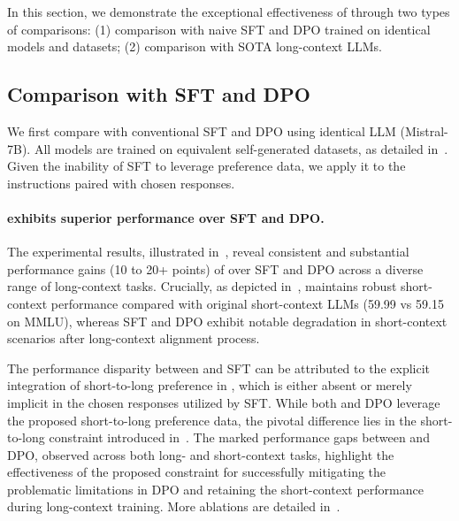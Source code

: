 In this section, we demonstrate the exceptional effectiveness of \ourMethod{} through two types of comparisons: (1) comparison with naive SFT and DPO trained on identical models and datasets;  (2) comparison with SOTA long-context LLMs. 





\subsection{Comparison with SFT and DPO}
\label{subsec:internal_comparison}

We first compare \ourMethod{} with conventional SFT and DPO using identical LLM (Mistral-7B). All models are trained on equivalent self-generated datasets, as detailed in~. Given the inability of SFT to leverage preference data, we apply it to the instructions paired with chosen responses.

\paragraph{\ourMethod{} exhibits superior performance over SFT and DPO.}
The experimental results, illustrated in~, reveal consistent and substantial performance gains (10 to 20+ points) of \ourMethod{} over SFT and DPO across a diverse range of long-context tasks. Crucially, as depicted in~, \ourMethod{} maintains robust short-context performance compared with original short-context LLMs (59.99 vs 59.15 on MMLU), whereas SFT and DPO exhibit notable degradation in short-context scenarios after long-context alignment process.

The performance disparity between \ourMethod{} and SFT can be attributed to the explicit integration of short-to-long preference in \ourMethod{}, which is either absent or merely implicit in the chosen responses utilized by SFT. 
While both \ourMethod{} and DPO leverage the proposed short-to-long preference data, the pivotal difference lies in the short-to-long constraint introduced in~. The marked performance gaps between \ourMethod{} and DPO, observed across both long- and short-context tasks, highlight the effectiveness of the proposed constraint for successfully mitigating the problematic limitations in DPO and retaining the short-context performance during long-context training. More ablations are detailed in~.

